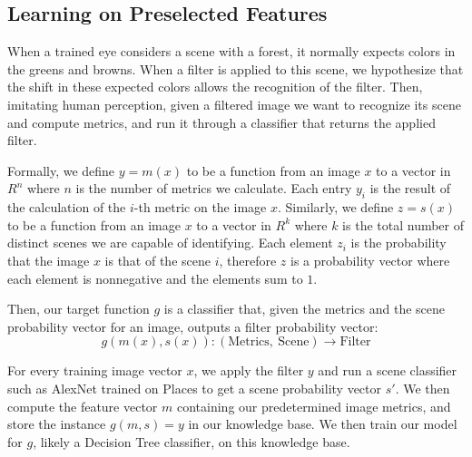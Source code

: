 \documentclass[a4paper, 11pt]{article}
\DeclareMathOperator{\dist}{dist}
\begin{document}
\subsection*{Learning on Preselected Features}
When a trained eye considers a scene with a forest, it normally expects colors in the greens and browns. When a filter is applied to this scene, we hypothesize that the shift in these expected colors allows the recognition of the filter. Then, imitating human perception, given a filtered image we want to recognize its scene and compute metrics, and run it through a classifier that returns the applied filter.

Formally, we define $y = m(x)$ to be a function from an image $x$ to a vector in $R^n$ where $n$ is the number of metrics we calculate. Each entry $y_i$ is the result of the calculation of the $i$-th metric on the image $x$. Similarly, we define $z = s(x)$ to be a function from an image $x$ to a vector in $R^k$ where $k$ is the total number of distinct scenes we are capable of identifying. Each element $z_i$ is the probability that the image $x$ is that of the scene $i$, therefore $z$ is a probability vector where each element is nonnegative and the elements sum to $1$.

Then, our target function $g$ is a classifier that, given the metrics and the scene probability vector for an image, outputs a filter probability vector:
$$g(m(x), s(x)) : (\text{Metrics},\ \text{Scene}) \to \text{Filter}$$



For every training image vector $x$, we apply the filter $y$ and run a scene classifier such as AlexNet trained on Places \cite{Places} to get a scene probability vector $s'$. We then compute the feature vector $m$ containing our predetermined image metrics, and store the instance $g(m, s) = y$ in our knowledge base. We then train our model for $g$, likely a Decision Tree classifier, on this knowledge base.
\end{document}
